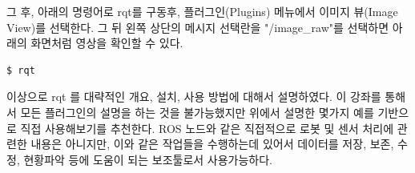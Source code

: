 그 후, 아래의 명령어로 rqt를 구동후, 플러그인(Plugins) 메뉴에서 이미지 뷰(Image View)를 선택한다. 그 뒤 왼쪽 상단의 메시지 선택란을 "/image\_raw"를 선택하면 아래의 화면처럼 영상을 확인할 수 있다. 

\begin{lstlisting}[language=ros]
$ rqt
\end{lstlisting}

이상으로 rqt 를 대략적인 개요, 설치, 사용 방법에 대해서 설명하였다. 이 강좌를 통해서 모든 플러그인의 설명을 하는 것을 불가능했지만 위에서 설명한 몇가지 예를 기반으로 직접 사용해보기를 추천한다. ROS 노드와 같은 직접적으로 로봇 및 센서 처리에 관련한 내용은 아니지만, 이와 같은 작업들을 수행하는데 있어서 데이터를 저장, 보존, 수정, 현황파악 등에 도움이 되는 보조툴로서 사용가능하다. 













